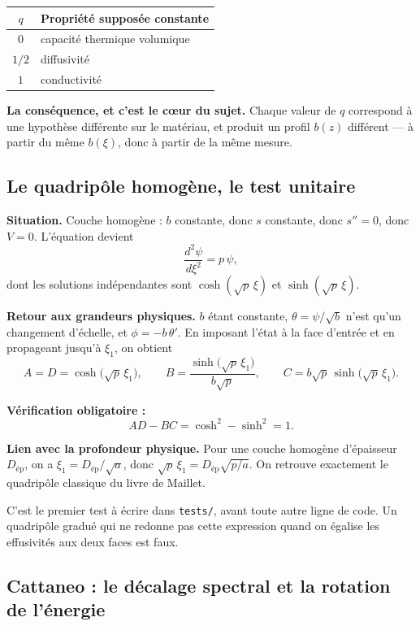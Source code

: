 \documentclass[11pt,a4paper]{article}
\begin{document}
\medskip
\begin{center}
\begin{tabular}{@{}cl@{}}
\toprule
$q$ & Propriété supposée constante \\
\midrule
$0$ & capacité thermique volumique \\
$1/2$ & diffusivité \\
$1$ & conductivité \\
\bottomrule
\end{tabular}
\end{center}
\medskip

\textbf{La conséquence, et c'est le cœur du sujet.} Chaque valeur de $q$ correspond à une hypothèse
différente sur le matériau, et produit un profil $b(z)$ différent --- à partir du même $b(\xi)$, donc
à partir de la même mesure.

\newpage
\subsection{Le quadripôle homogène, le test unitaire}

\textbf{Situation.} Couche homogène : $b$ constante, donc $s$ constante, donc $s'' = 0$, donc $V = 0$.
L'équation devient
\[ \frac{d^{2}\psi}{d\xi^{2}} = p\,\psi , \]
dont les solutions indépendantes sont $\cosh(\sqrt{p}\,\xi)$ et $\sinh(\sqrt{p}\,\xi)$.

\textbf{Retour aux grandeurs physiques.} $b$ étant constante, $\theta = \psi/\sqrt{b}$ n'est qu'un
changement d'échelle, et $\phi = -b\,\theta'$. En imposant l'état à la face d'entrée et en propageant
jusqu'à $\xi_{1}$, on obtient
\[ A = D = \cosh\bigl(\sqrt{p}\,\xi_{1}\bigr),
\qquad
B = \frac{\sinh\bigl(\sqrt{p}\,\xi_{1}\bigr)}{b\sqrt{p}},
\qquad
C = b\sqrt{p}\,\sinh\bigl(\sqrt{p}\,\xi_{1}\bigr) . \]

\textbf{Vérification obligatoire :}
\[ AD - BC = \cosh^{2} - \sinh^{2} = 1 . \]

\textbf{Lien avec la profondeur physique.} Pour une couche homogène d'épaisseur $D_{\text{ép}}$, on a
$\xi_{1} = D_{\text{ép}}/\sqrt{a}$, donc $\sqrt{p}\,\xi_{1} = D_{\text{ép}}\sqrt{p/a}$. On retrouve
exactement le quadripôle classique du livre de Maillet.

C'est le premier test à écrire dans \texttt{tests/\allowbreak }, avant toute autre ligne de code. Un quadripôle
gradué qui ne redonne pas cette expression quand on égalise les effusivités aux deux faces est faux.

\subsection{Cattaneo : le décalage spectral et la rotation de l'énergie}
\end{document}
